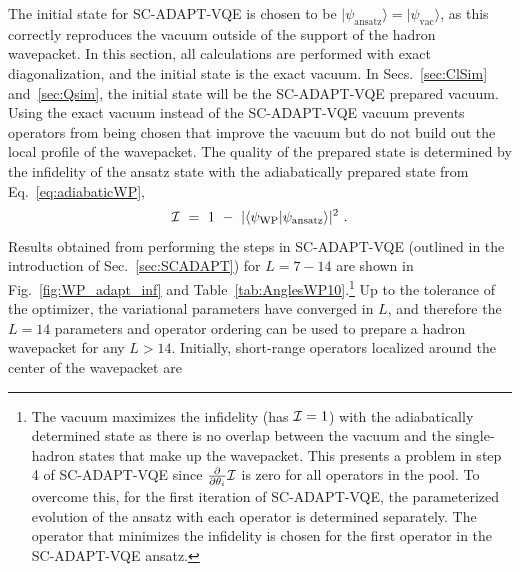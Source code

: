 \documentclass[aps, prc, tightenlines,superscriptaddress, letterpaper, amsmath, amssymb, preprintnumbers, floatfix, longbibliography, nofootinbib]{revtex4-2}
\begin{document}
The initial state for SC-ADAPT-VQE is chosen to be $\lvert \psi_{\text{ansatz}} \rangle = \lvert \psi_{\text{vac}} \rangle$, as this correctly reproduces the vacuum outside of the support of the hadron wavepacket.
In this section, all calculations are performed with exact diagonalization, and the initial state is the exact vacuum. 
In Secs.~\ref{sec:ClSim} and~\ref{sec:Qsim}, the initial state will be the SC-ADAPT-VQE prepared vacuum. 
Using the exact vacuum instead of the SC-ADAPT-VQE vacuum prevents operators from being chosen that improve the vacuum but do not build out the local profile of the wavepacket.
The quality of the prepared state is determined by the infidelity of the ansatz state with the adiabatically prepared state from Eq.~\eqref{eq:adiabaticWP},
%
\begin{equation}
{\cal I} \ = \ 1 \ - \ \vert \langle \psi_{\text{WP}} \vert \psi_{\text{ansatz}}\rangle\vert^2 \ .
\label{eq:inf_wp_scadapt}
\end{equation}
%
Results obtained from performing the steps in SC-ADAPT-VQE (outlined in the introduction of Sec.~\ref{sec:SCADAPT}) for $L=7-14$ are shown in Fig.~\ref{fig:WP_adapt_inf} and Table~\ref{tab:AnglesWP10}.\footnote{The vacuum maximizes the infidelity (has ${\cal I}=1$) with the adiabatically determined state as there is no overlap between the vacuum and the single-hadron states that make up the wavepacket.
This presents a problem in step 4 of SC-ADAPT-VQE since $\frac{\partial}{\partial \theta_i} {\cal I}$ is zero for all operators in the pool.
To overcome this, for the first iteration of SC-ADAPT-VQE, the parameterized evolution of the ansatz with each operator is determined separately.
The operator that minimizes the infidelity is chosen for the first operator in the SC-ADAPT-VQE ansatz.}
Up to the tolerance of the optimizer, the variational parameters have converged in $L$, and therefore the $L=14$ parameters and operator ordering can be used 
to prepare a hadron wavepacket for any $L>14$.
Initially, short-range operators localized around the center of the wavepacket are 
\end{document}
